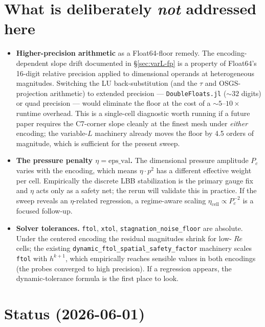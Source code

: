 \documentclass[11pt]{article}
\newcommand{\Reyn}{\operatorname{\mathit{Re}}}
\newcommand{\code}[1]{\texttt{#1}}
\begin{document}
\section{What is deliberately \emph{not} addressed here}

\begin{itemize}
  \item \textbf{Higher-precision arithmetic} as a Float64-floor remedy.
        The encoding-dependent slope drift documented in
        §\ref{sec:varL-fp} is a property of Float64's 16-digit relative
        precision applied to dimensional operands at heterogeneous
        magnitudes. Switching the LU back-substitution (and the
        $\tau$ and OSGS-projection arithmetic) to extended precision
        — \code{DoubleFloats.jl} ($\sim 32$ digits) or quad precision —
        would eliminate the floor at the cost of a $\sim 5$--$10\times$
        runtime overhead. This is a single-cell diagnostic worth
        running if a future paper requires the C7-corner slope cleanly
        at the finest mesh under \emph{either} encoding; the variable-$L$
        machinery already moves the floor by 4.5 orders of magnitude,
        which is sufficient for the present sweep.
  \item \textbf{The pressure penalty $\eta = \mathrm{eps\_val}$.}
        The dimensional pressure amplitude $P_c$ varies with the encoding,
        which means $\eta \cdot p^2$ has a different effective weight per
        cell. Empirically the discrete LBB stabilization is the primary
        gauge fix and $\eta$ acts only as a safety net; the rerun will
        validate this in practice. If the sweep reveals an $\eta$-related
        regression, a regime-aware scaling
        $\eta_{\mathrm{cell}} \propto P_c^{-2}$ is a focused follow-up.
  \item \textbf{Solver tolerances.}
        \texttt{ftol}, \texttt{xtol}, \texttt{stagnation\_noise\_floor}
        are absolute. Under the centered encoding the residual magnitudes
        shrink for low-$\Reyn$ cells; the existing
        \texttt{dynamic\_ftol\_spatial\_safety\_factor} machinery scales
        \texttt{ftol} with $h^{k+1}$, which empirically reaches sensible
        values in both encodings (the probes converged to high precision).
        If a regression appears, the dynamic-tolerance formula is the
        first place to look.
\end{itemize}

\section*{Status (2026-06-01)}
\end{document}
